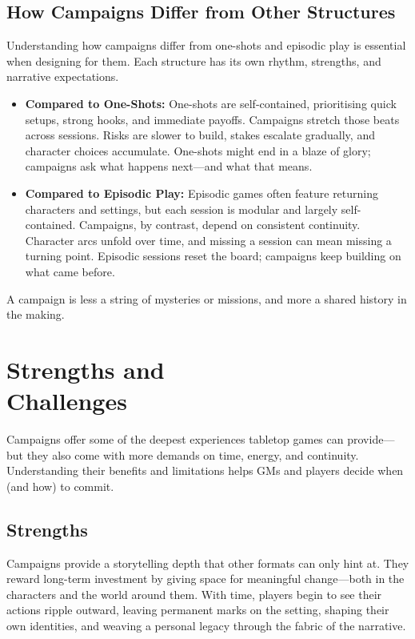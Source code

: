 \subsection*{How Campaigns Differ from Other Structures}

Understanding how campaigns differ from one-shots and episodic play is essential when designing for them. Each structure has its own rhythm, strengths, and narrative expectations.

\begin{itemize}
    \item \textbf{Compared to One-Shots:}  
    One-shots are self-contained, prioritising quick setups, strong hooks, and immediate payoffs. Campaigns stretch those beats across sessions. Risks are slower to build, stakes escalate gradually, and character choices accumulate. One-shots might end in a blaze of glory; campaigns ask what happens next—and what that means.

    \item \textbf{Compared to Episodic Play:}  
    Episodic games often feature returning characters and settings, but each session is modular and largely self-contained. Campaigns, by contrast, depend on consistent continuity. Character arcs unfold over time, and missing a session can mean missing a turning point. Episodic sessions reset the board; campaigns keep building on what came before.
\end{itemize}

A campaign is less a string of mysteries or missions, and more a shared history in the making.

\section[Strengths and Challenges]{Strengths and\\ Challenges}

Campaigns offer some of the deepest experiences tabletop games can provide—but they also come with more demands on time, energy, and continuity. Understanding their benefits and limitations helps GMs and players decide when (and how) to commit.

\subsection*{Strengths}

Campaigns provide a storytelling depth that other formats can only hint at. They reward long-term investment by giving space for meaningful change—both in the characters and the world around them. With time, players begin to see their actions ripple outward, leaving permanent marks on the setting, shaping their own identities, and weaving a personal legacy through the fabric of the narrative.


